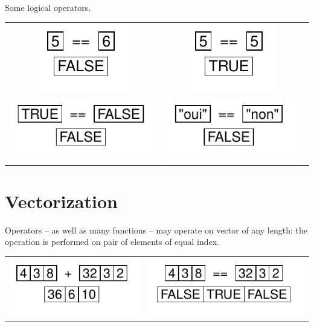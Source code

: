 \documentclass[pdflatex]{article}
\begin{document}
Some logical operators.

\begin{tabular}{ccc}
\includegraphics{operator_equality_num} & \includegraphics{operator_equality_num_TRUE}\\
\includegraphics{operator_equality_log} & \includegraphics{operator_equality_char}\\
\end{tabular}

\section{Vectorization}

Operators -- as well as many functions -- may operate on vector of any length: the operation is performed on pair of elements of equal index.

\begin{tabular}{cc}
\includegraphics{operator_plus_vectorized} & \includegraphics{operator_equal_vectorized}\\
\end{tabular}
\end{document}
